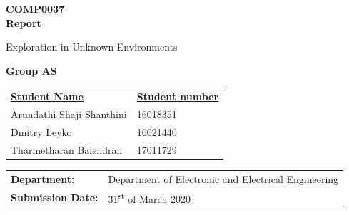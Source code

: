 \documentclass[a4paper,12pt]{article}
\begin{document}
	\selectfont
	\begin{titlepage}
		\setlength{\voffset}{-0.8in}
		\noindent {}
	
			\vspace{15mm}
			
			\begin{center}
				{\Huge \textbf{COMP0037 \\ \vspace{10mm} Report}}
			
				\vspace{8mm}
			
				\begin{spacing}{1.8}
					{\huge Exploration in Unknown Environments}
				\end{spacing}
		
			
				\vspace{12mm}
			
				{\LARGE \textbf{Group AS}}
				
				\vspace{10mm}
				
				\begin{tabular}{ll}
					\underline{\textbf{Student Name}}  & \hspace{4mm} \underline{\textbf{Student number}} \vspace{2mm} \\
					Arundathi Shaji Shanthini & \hspace{4mm} 16018351 \\ 
					Dmitry Leyko & \hspace{4mm}  16021440\\ 
					Tharmetharan Balendran & \hspace{4mm} 17011729\\ 
				\end{tabular}
				
				\vspace{13mm}
				
				\begin{tabular}{ll}
					\textbf{Department:} &  Department of Electronic and Electrical Engineering\\ \vspace{3mm}
					\textbf{Submission Date:} &  31\textsuperscript{st} of March 2020
				\end{tabular}
			\end{center}
	\end{titlepage}
	
\end{document}
